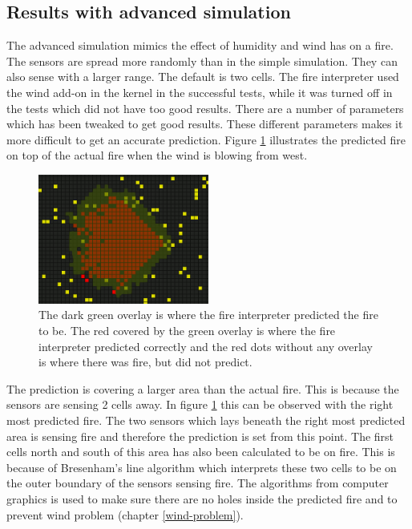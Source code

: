 \subsection{Results with advanced simulation}
The advanced simulation mimics the effect of humidity and wind has on a fire. The sensors are spread more randomly than in the simple simulation. They can also sense with a larger range. The default is two cells. The fire interpreter used the wind add-on in the kernel in the successful tests, while it was turned off in the tests which did not have too good results. There are a number of parameters which has been tweaked to get good results. These different parameters makes it more difficult to get an accurate prediction. Figure \ref{fig:wind-advanced-bresenham-large} illustrates the predicted fire on top of the actual fire when the wind is blowing from west.

\begin{figure}[here]
  \centering
      \includegraphics[width=0.5\textwidth]{discussion/graphics/wind-advanced-bresenham-large.png}
  \caption{The dark green overlay is where the fire interpreter predicted the fire to be. The red covered by the green overlay is where the fire interpreter predicted correctly and the red dots without any overlay is where there was fire, but did not predict.}
  \label{fig:wind-advanced-bresenham-large}
\end{figure}

The prediction is covering a larger area than the actual fire. This is because the sensors are sensing 2 cells away. In figure \ref{fig:wind-advanced-bresenham-large} this can be observed with the right most predicted fire. The two sensors which lays beneath the right most predicted area is sensing fire and therefore the prediction is set from this point. The first cells north and south of this area has also been calculated to be on fire. This is because of Bresenham’s line algorithm which interprets these two cells to be on the outer boundary of the sensors sensing fire. The algorithms from computer graphics is used to make sure there are no holes inside the predicted fire and to prevent wind problem (chapter \ref{wind-problem}).

